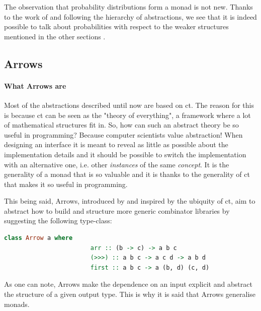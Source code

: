 \documentclass[
  oneside,
  11pt, a4paper,
  footinclude=true,
  headinclude=true,
  cleardoublepage=empty
]{scrbook}
\theoremstyle{definition}
\theoremstyle{definition}
\begin{document}
	The observation that probability distributions form a monad is not new. Thanks to the work of \cite{giry1982} and following the hierarchy of abstractions, we see that it is indeed possible to talk about probabilities with respect to the weaker structures mentioned in the other sections \citep{jtobin, Scibior19}.
	            
	    \subsection{Arrows}
	    
	        \paragraph{What Arrows are}
	        
    Most of the abstractions described until now are based on \gls{ct}. The reason for this is because \gls{ct} can be seen as the "theory of everything", a framework where a lot of mathematical structures fit in. So, how can such an abstract theory be so useful in programming? Because computer scientists value abstraction! When designing an interface it is meant to reveal as little as possible about the implementation details and it should be possible to switch the implementation with an alternative one, i.e. other \emph{instances} of the same \emph{concept}. It is the generality of a monad that is so valuable and it is thanks to the generality of \gls{ct} that makes it so useful in programming.
    	        
    This being said, Arrows, introduced by \cite{Hughes:2000:GMA:347238.347246} and inspired by the ubiquity of \gls{ct}, aim to abstract how to build and structure more generic combinator libraries by suggesting the following type-class:
    	        
                \begin{lstlisting}[mathescape, language=Haskell, caption={Arrow type-class},captionpos=b]
                    class Arrow a where
                        arr :: (b -> c) -> a b c
                        (>>>) :: a b c -> a c d -> a b d
                        first :: a b c -> a (b, d) (c, d)
    	        \end{lstlisting}{}
    	       
    As one can note, Arrows make the dependence on an input explicit and abstract the structure of a given output type. This is why it is said that Arrows generalise monads.
    	       
\end{document}
